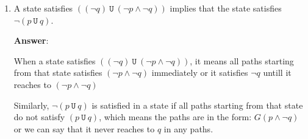 \documentclass[11pt]{article}
\newcommand{\af}[1]{\texttt{AF}(#1)}
\newcommand{\ef}[1]{\texttt{EF}(#1)}
\newcommand{\ag}[1]{\texttt{AG}(#1)}
\newcommand{\lf}[1]{\texttt{F}(#1)}
\newcommand{\llg}[1]{\texttt{G}(#1)}
\newcommand{\lu}[2]{(#1\ \texttt{U}\ #2)}
\begin{document}
\begin{enumerate}
\begin{enumerate}
\begin{center}
        \end{center}




       


       
  \item A state satisfies $\lu{(\neg q)}{(\neg p \land \neg q)} $ implies
    that the state satisfies $\neg \lu{p}{q}$.
    
\textbf{Answer}:

When a state satisfies $\lu{(\neg q)}{(\neg p \land \neg q)} $, it means all paths starting from that state satisfies $(\neg p \land \neg q)$ immediately or it satisfies $\neg q$ untill it reaches to $(\neg p \land \neg q)$

Similarly, $\neg \lu{p}{q}$ is satisfied in a state if all paths starting from that state do not satisfy $\lu{p}{q}$, which means the paths are in the form: $G(p \land \neg q)$ or we can say that it never reaches to $q$ in any paths. 



\end{enumerate}
\end{enumerate}
\end{document}
